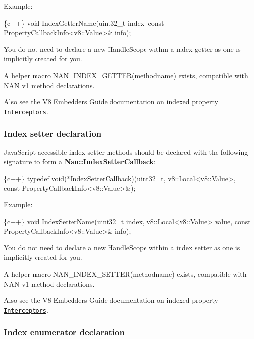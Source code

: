 Example\+:


\begin{DoxyCode}
\{c++\}
void IndexGetterName(uint32\_t index, const PropertyCallbackInfo<v8::Value>& info);
\end{DoxyCode}


You do not need to declare a new {\ttfamily Handle\+Scope} within a index getter as one is implicitly created for you.

A helper macro {\ttfamily N\+A\+N\+\_\+\+I\+N\+D\+E\+X\+\_\+\+G\+E\+T\+T\+E\+R(methodname)} exists, compatible with N\+AN v1 method declarations.

Also see the V8 Embedders Guide documentation on indexed property \href{https://developers.google.com/v8/embed#interceptors}{\tt Interceptors}.

\label{_api_nan_index_setter}%
 \subsubsection*{Index setter declaration}

Java\+Script-\/accessible index setter methods should be declared with the following signature to form a {\bfseries {\ttfamily Nan\+::\+Index\+Setter\+Callback}}\+:


\begin{DoxyCode}
\{c++\}
typedef void(*IndexSetterCallback)(uint32\_t,
                                   v8::Local<v8::Value>,
                                   const PropertyCallbackInfo<v8::Value>&);
\end{DoxyCode}


Example\+:


\begin{DoxyCode}
\{c++\}
void IndexSetterName(uint32\_t index,
                     v8::Local<v8::Value> value,
                     const PropertyCallbackInfo<v8::Value>& info);
\end{DoxyCode}


You do not need to declare a new {\ttfamily Handle\+Scope} within a index setter as one is implicitly created for you.

A helper macro {\ttfamily N\+A\+N\+\_\+\+I\+N\+D\+E\+X\+\_\+\+S\+E\+T\+T\+E\+R(methodname)} exists, compatible with N\+AN v1 method declarations.

Also see the V8 Embedders Guide documentation on indexed property \href{https://developers.google.com/v8/embed#interceptors}{\tt Interceptors}.

\label{_api_nan_index_enumerator}%
 \subsubsection*{Index enumerator declaration}

